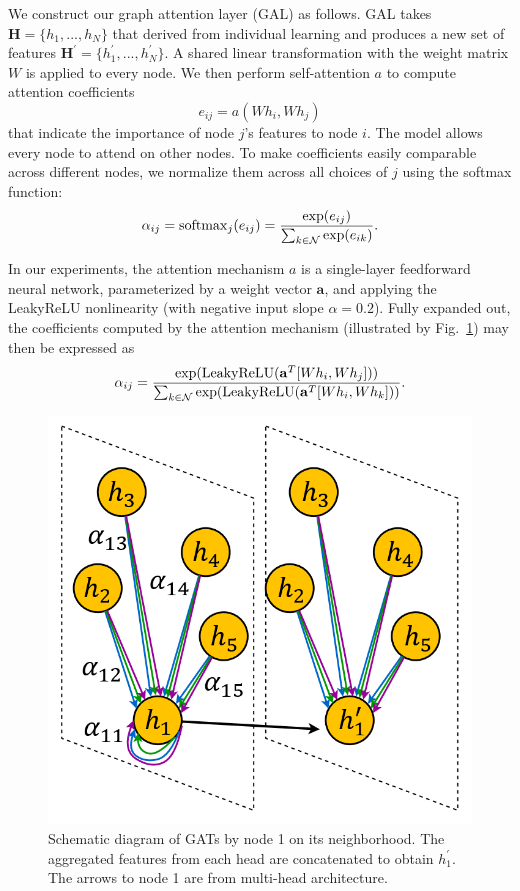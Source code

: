\documentclass[twocolumn]{svjour3}
\begin{document}
We construct our graph attention layer (GAL) as follows. GAL takes $\mathbf{H} = \{h_1, ..., h_N\}$ that derived from individual learning and produces a new set of features $\mathbf{H}^{\prime}  = \{h_1^{\prime}, ..., h_N^{\prime}\}$. A shared linear transformation with the weight matrix $W$ is applied to every node. We then perform self-attention $a$ to compute attention coefficients
\begin{equation}
  e_{ij} = a\left(Wh_i,Wh_j\right)
\end{equation}
that indicate the importance of node $j$'s features to node $i$. The model allows every node to attend on other nodes. To make coefficients easily comparable across different nodes, we normalize them across all choices of $j$ using the softmax function:
\begin{equation}
  \alpha_{ij} = {\rm softmax}_j(e_{ij}) = \frac{{\rm exp}(e_{ij})}{\sum_{k \in \mathcal{N}}{\rm exp}(e_{ik})}.
\end{equation}

In our experiments, the attention mechanism $a$ is a single-layer feedforward neural network, parameterized by a weight vector $\mathbf{a}$, and applying the LeakyReLU nonlinearity (with negative input slope $\alpha = 0.2$). Fully expanded out, the coefficients computed by the attention mechanism (illustrated by Fig.~\ref{f:gats}) may then be expressed as
\begin{equation}
  \alpha_{ij} = \frac{{\rm exp}({\rm LeakyReLU}(\mathbf{a}^T[Wh_i,Wh_j]))}{\sum_{k \in \mathcal{N}}{\rm exp}({\rm LeakyReLU}(\mathbf{a}^T[Wh_i,Wh_k]))}.
\end{equation}

\begin{figure}[t]
  \centering
  \includegraphics[width=0.5\linewidth]{assets/gats_3}
  \caption{Schematic diagram of GATs by node 1 on its neighborhood. The aggregated features from each head are concatenated to obtain $h_1^{\prime}$. The arrows to node 1 are from multi-head architecture.}
  \label{f:gats}
\end{figure}
\end{document}
